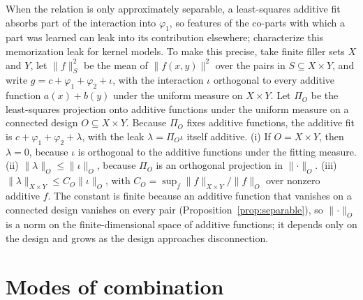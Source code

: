\documentclass[10pt]{article}
\theoremstyle{plain}
\theoremstyle{remark}
\begin{document}
\noindent
When the relation is only approximately separable, a least-squares additive fit absorbs part of the interaction into $\varphi_1$, so features of the co-parts with which a part was learned can leak into its contribution elsewhere; \citet{lippl2025} characterize this memorization leak for kernel models. To make this precise, take finite filler sets $X$ and $Y$, let $\lVert f \rVert_S^2$ be the mean of $\lVert f(x, y) \rVert^2$ over the pairs in $S \subseteq X \times Y$, and write $g = c + \varphi_1 + \varphi_2 + \iota$, with the interaction $\iota$ orthogonal to every additive function $a(x) + b(y)$ under the uniform measure on $X \times Y$. Let $\Pi_O$ be the least-squares projection onto additive functions under the uniform measure on a connected design $O \subseteq X \times Y$. Because $\Pi_O$ fixes additive functions, the additive fit is $c + \varphi_1 + \varphi_2 + \lambda$, with the leak $\lambda = \Pi_O \iota$ itself additive. (i) If $O = X \times Y$, then $\lambda = 0$, because $\iota$ is orthogonal to the additive functions under the fitting measure. (ii) $\lVert \lambda \rVert_O \le \lVert \iota \rVert_O$, because $\Pi_O$ is an orthogonal projection in $\lVert \cdot \rVert_O$. (iii) $\lVert \lambda \rVert_{X \times Y} \le C_O \lVert \iota \rVert_O$, with $C_O = \sup_f \lVert f \rVert_{X \times Y} / \lVert f \rVert_O$ over nonzero additive $f$. The constant is finite because an additive function that vanishes on a connected design vanishes on every pair (Proposition~\ref{prop:separable}), so $\lVert \cdot \rVert_O$ is a norm on the finite-dimensional space of additive functions; it depends only on the design and grows as the design approaches disconnection.

\section{Modes of combination}
\label{app:forms}
\end{document}

